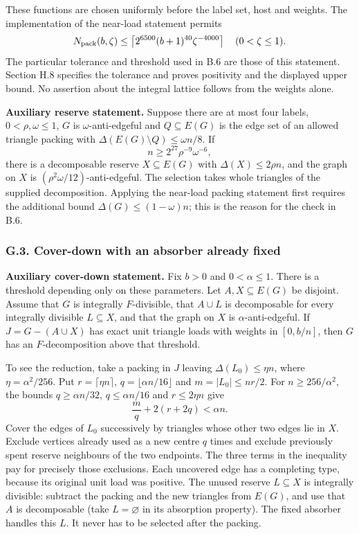 \documentclass[english,11pt,a4paper]{article}
\begin{document}
These functions are chosen uniformly before the label set, host and weights. The implementation of the near-load statement permits \[N_{\rm pack}(b,\zeta)\le
\left\lceil2^{6500}(b+1)^{40}\zeta^{-4000}\right\rceil
\quad(0<\zeta\le1).\] The particular tolerance and threshold used in B.6 are those of this statement. Section H.8 specifies the tolerance and proves positivity and the displayed upper bound. No assertion about the integral lattice follows from the weights alone.

\textbf{Auxiliary reserve statement.} Suppose there are at most four labels, \(0<\rho,\omega\le1\), \(G\) is \(\omega\)-anti-edgeful and \(Q\subseteq E(G)\) is the edge set of an allowed triangle packing with \(\Delta(E(G)\setminus Q)\le\omega n/8\). If \[n\ge2^{27}\rho^{-9}\omega^{-6},\] there is a decomposable reserve \(X\subseteq E(G)\) with \(\Delta(X)\le2\rho n\), and the graph on \(X\) is \((\rho^2\omega/12)\)-anti-edgeful. The selection takes whole triangles of the supplied decomposition. Applying the near-load packing statement first requires the additional bound \(\Delta(G)\le(1-\omega)n\); this is the reason for the check in B.6.

\subsubsection{G.3. Cover-down with an absorber already fixed}\label{g.3.-cover-down-with-an-absorber-already-fixed}

\textbf{Auxiliary cover-down statement.} Fix \(b>0\) and \(0<\alpha\le1\). There is a threshold depending only on these parameters. Let \(A,X\subseteq E(G)\) be disjoint. Assume that \(G\) is integrally \(F\)-divisible, that \(A\cup L\) is decomposable for every integrally divisible \(L\subseteq X\), and that the graph on \(X\) is \(\alpha\)-anti-edgeful. If \(J=G-(A\cup X)\) has exact unit triangle loads with weights in \([0,b/n]\), then \(G\) has an \(F\)-decomposition above that threshold.

To see the reduction, take a packing in \(J\) leaving \(\Delta(L_0)\le\eta n\), where \(\eta=\alpha^2/256\). Put \(r=\lceil\eta n\rceil\), \(q=\lfloor\alpha n/16\rfloor\) and \(m=|L_0|\le nr/2\). For \(n\ge256/\alpha^2\), the bounds \(q\ge\alpha n/32\), \(q\le\alpha n/16\) and \(r\le2\eta n\) give \[\frac m q+2(r+2q)<\alpha n.\] Cover the edges of \(L_0\) successively by triangles whose other two edges lie in \(X\). Exclude vertices already used as a new centre \(q\) times and exclude previously spent reserve neighbours of the two endpoints. The three terms in the inequality pay for precisely those exclusions. Each uncovered edge has a completing type, because its original unit load was positive. The unused reserve \(L\subseteq X\) is integrally divisible: subtract the packing and the new triangles from \(E(G)\), and use that \(A\) is decomposable (take \(L=\varnothing\) in its absorption property). The fixed absorber handles this \(L\). It never has to be selected after the packing.
\end{document}
